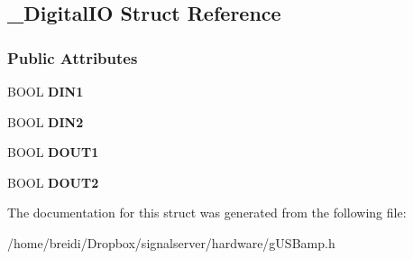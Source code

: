 \hypertarget{struct___digital_i_o}{
\subsection{\_\-DigitalIO Struct Reference}
\label{struct___digital_i_o}
}
\subsubsection*{Public Attributes}
\begin{DoxyCompactItemize}
\item 
\hypertarget{struct___digital_i_o_aaf94a1926f6eef49cb984cd8f16c47c8}{
BOOL {\bfseries DIN1}}
\label{struct___digital_i_o_aaf94a1926f6eef49cb984cd8f16c47c8}

\item 
\hypertarget{struct___digital_i_o_ad3b10c01d73319c888710120f8ed77db}{
BOOL {\bfseries DIN2}}
\label{struct___digital_i_o_ad3b10c01d73319c888710120f8ed77db}

\item 
\hypertarget{struct___digital_i_o_ada0ff4b442cf969e1a4430b77cc906c7}{
BOOL {\bfseries DOUT1}}
\label{struct___digital_i_o_ada0ff4b442cf969e1a4430b77cc906c7}

\item 
\hypertarget{struct___digital_i_o_abdd153f248b345532ddcfe875631d0a4}{
BOOL {\bfseries DOUT2}}
\label{struct___digital_i_o_abdd153f248b345532ddcfe875631d0a4}

\end{DoxyCompactItemize}


The documentation for this struct was generated from the following file:\begin{DoxyCompactItemize}
\item 
/home/breidi/Dropbox/signalserver/hardware/gUSBamp.h\end{DoxyCompactItemize}
